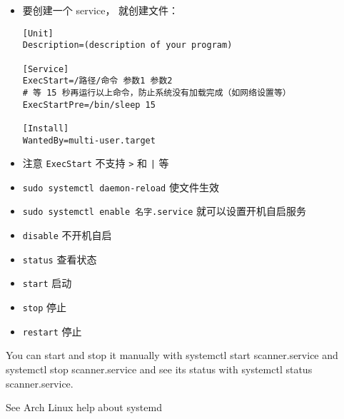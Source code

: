 
\begin{issues}
\issueDraft
\end{issues}

\begin{itemize}
\item 要创建一个 service， 就创建文件：
\begin{lstlisting}[language=none,caption=/etc/systemd/system/名字.service]
[Unit]
Description=(description of your program)

[Service]
ExecStart=/路径/命令 参数1 参数2
# 等 15 秒再运行以上命令，防止系统没有加载完成（如网络设置等）
ExecStartPre=/bin/sleep 15

[Install]
WantedBy=multi-user.target
\end{lstlisting}
\item 注意 \verb|ExecStart| 不支持 \verb|>| 和 \verb`|` 等
\item \verb|sudo systemctl daemon-reload| 使文件生效
\item \verb|sudo systemctl enable 名字.service| 就可以设置开机自启服务
\item \verb|disable| 不开机自启
\item \verb|status| 查看状态
\item \verb|start| 启动
\item \verb|stop| 停止
\item \verb|restart| 停止
\end{itemize}

You can start and stop it manually with systemctl start scanner.service and systemctl stop scanner.service and see its status with systemctl status scanner.service.

See Arch Linux help about systemd
